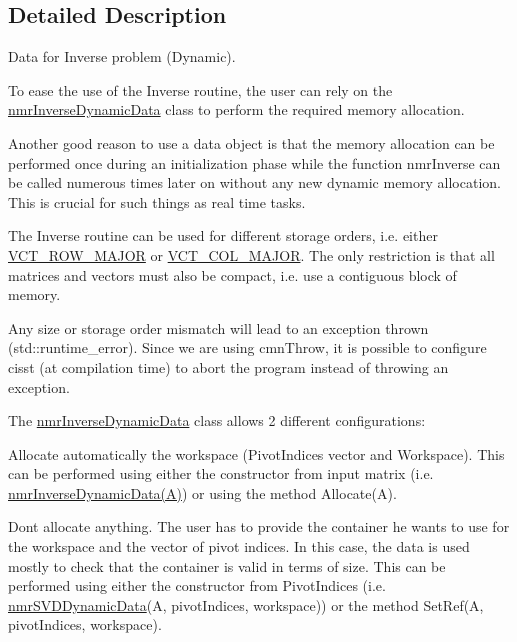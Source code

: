 \subsection{Detailed Description}
Data for Inverse problem (Dynamic). 

To ease the use of the Inverse routine, the user can rely on the \hyperlink{classnmr_inverse_dynamic_data}{nmr\+Inverse\+Dynamic\+Data} class to perform the required memory allocation.

Another good reason to use a data object is that the memory allocation can be performed once during an initialization phase while the function nmr\+Inverse can be called numerous times later on without any new dynamic memory allocation. This is crucial for such things as real time tasks.

The Inverse routine can be used for different storage orders, i.\+e. either \hyperlink{vct_forward_declarations_8h_a45ba752f741240bf765417ebc8130d62}{V\+C\+T\+\_\+\+R\+O\+W\+\_\+\+M\+A\+J\+O\+R} or \hyperlink{vct_forward_declarations_8h_a432cdf8923afaf82f551450ad4034746}{V\+C\+T\+\_\+\+C\+O\+L\+\_\+\+M\+A\+J\+O\+R}. The only restriction is that all matrices and vectors must also be compact, i.\+e. use a contiguous block of memory.

Any size or storage order mismatch will lead to an exception thrown (std\+::runtime\+\_\+error). Since we are using cmn\+Throw, it is possible to configure cisst (at compilation time) to abort the program instead of throwing an exception.

The \hyperlink{classnmr_inverse_dynamic_data}{nmr\+Inverse\+Dynamic\+Data} class allows 2 different configurations\+:


\begin{DoxyItemize}
\item Allocate automatically the workspace (Pivot\+Indices vector and Workspace). This can be performed using either the constructor from input matrix (i.\+e. \hyperlink{classnmr_inverse_dynamic_data}{nmr\+Inverse\+Dynamic\+Data(\+A)}) or using the method Allocate(\+A).
\item Don\textquotesingle{}t allocate anything. The user has to provide the container he wants to use for the workspace and the vector of pivot indices. In this case, the data is used mostly to check that the container is valid in terms of size. This can be performed using either the constructor from Pivot\+Indices (i.\+e. \hyperlink{classnmr_s_v_d_dynamic_data}{nmr\+S\+V\+D\+Dynamic\+Data}(A, pivot\+Indices, workspace)) or the method Set\+Ref(A, pivot\+Indices, workspace).
\end{DoxyItemize}

